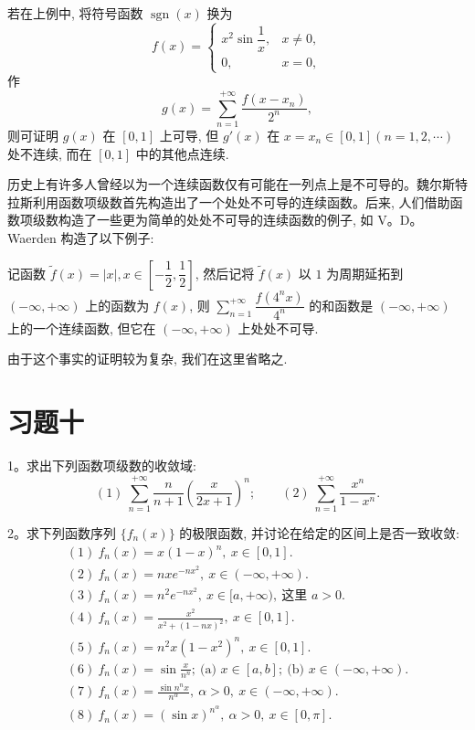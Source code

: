 \begin{remark}\label{remark:ma-10-source-75}
若在上例中, 将符号函数 $\operatorname{sgn}(x)$ 换为
\[
  f(x)=
  \begin{cases}
    x^2\sin\dfrac1x, & x\ne0,\\
    0, & x=0,
  \end{cases}
\]
作
\[
  g(x)=\sum_{n=1}^{+\infty}\frac{f(x-x_n)}{2^n},
\]
则可证明 $g(x)$ 在 $[0,1]$ 上可导, 但 $g'(x)$ 在 $x=x_n\in[0,1](n=1,2,\cdots)$ 处不连续, 而在 $[0,1]$ 中的其他点连续.
\end{remark}

历史上有许多人曾经以为一个连续函数仅有可能在一列点上是不可导的。魏尔斯特拉斯利用函数项级数首先构造出了一个处处不可导的连续函数。后来, 人们借助函数项级数构造了一些更为简单的处处不可导的连续函数的例子, 如 V。D。Waerden 构造了以下例子:

记函数 $\widetilde f(x)=|x|, x\in\left[-\dfrac12,\dfrac12\right]$, 然后记将 $\widetilde f(x)$ 以 $1$ 为周期延拓到 $(-\infty,+\infty)$ 上的函数为 $f(x)$, 则 $\sum\limits_{n=1}^{+\infty}\dfrac{f(4^n x)}{4^n}$ 的和函数是 $(-\infty,+\infty)$ 上的一个连续函数, 但它在 $(-\infty,+\infty)$ 上处处不可导.

由于这个事实的证明较为复杂, 我们在这里省略之.

\section*{习题十}
{}
\label{exercises:ma-10}

1。求出下列函数项级数的收敛域:
\[
  (1)\ \sum_{n=1}^{+\infty}\frac{n}{n+1}\left(\frac{x}{2x+1}\right)^n;\qquad
  (2)\ \sum_{n=1}^{+\infty}\frac{x^n}{1-x^n}.
\]

2。求下列函数序列 $\{f_n(x)\}$ 的极限函数, 并讨论在给定的区间上是否一致收敛:
\[
\begin{gathered}
  (1)\ f_n(x)=x(1-x)^n,\ x\in[0,1].\\
  (2)\ f_n(x)=nxe^{-nx^2},\ x\in(-\infty,+\infty).\\
  (3)\ f_n(x)=n^2e^{-nx^2},\ x\in[a,+\infty),\ \text{这里 }a>0.\\
  (4)\ f_n(x)=\frac{x^2}{x^2+(1-nx)^2},\ x\in[0,1].\\
  (5)\ f_n(x)=n^2x(1-x^2)^n,\ x\in[0,1].\\
  (6)\ f_n(x)=\sin\frac{x}{n^n};\ \text{(a) }x\in[a,b];\ \text{(b) }x\in(-\infty,+\infty).\\
  (7)\ f_n(x)=\frac{\sin n^n x}{n^\alpha},\ \alpha>0,\ x\in(-\infty,+\infty).\\
  (8)\ f_n(x)=(\sin x)^{n^\alpha},\ \alpha>0,\ x\in[0,\pi].
\end{gathered}
\]

